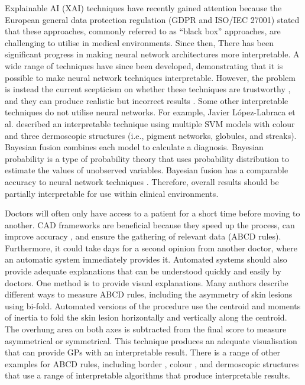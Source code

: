 \documentclass[10.5pt]{report}
\begin{document}
Explainable AI (XAI) techniques have recently gained attention because the European general data protection regulation (GDPR and ISO/IEC 27001) stated that these approaches, commonly referred to as ``black box'' approaches, are challenging to utilise in medical environments. Since then, There has been significant progress in making neural network architectures more interpretable. A wide range of techniques \cite{Fuji2019,  Selvaraju2016, Ribeiro2016} have since been developed, demonstrating that it is possible to make neural network techniques interpretable. However, the problem is instead the current scepticism on whether these techniques are trustworthy \cite{Tjoa2019, Samek2019a}, and they can produce realistic but incorrect results \cite{Ghorbani2019}. Some other interpretable techniques do not utilise neural networks. For example, Javier López-Labraca et al. \cite{Lopez-Labraca2018} described an interpretable technique using multiple SVM models with colour and three dermoscopic structures (i.e., pigment networks, globules, and streaks). Bayesian fusion combines each model to calculate a diagnosis. Bayesian probability is a type of probability theory that uses probability distribution to estimate the values of unobserved variables. Bayesian fusion has a comparable accuracy to neural network techniques \cite{Takruri2017}. Therefore, overall results should be partially interpretable for use within clinical environments.

Doctors will often only have access to a patient for a short time before moving to another. CAD frameworks are beneficial because they speed up the process, can improve accuracy \cite{Dick2019}, and ensure the gathering of relevant data (ABCD rules). Furthermore, it could take days for a second opinion from another doctor, where an automatic system immediately provides it. Automated systems should also provide adequate explanations that can be understood quickly and easily by doctors. One method is to provide visual explanations. Many authors \cite{Zaqout2016, Kasmi2016a, Ali2020a} describe different ways to measure ABCD rules, including the asymmetry of skin lesions using bi-fold. Automated versions of the procedure use the centroid and moments of inertia to fold the skin lesion horizontally and vertically along the centroid. The overhung area on both axes is subtracted from the final score to measure asymmetrical or symmetrical. This technique produces an adequate visualisation that can provide GPs with an interpretable result. There is a range of other examples for ABCD rules, including border \cite{Kasmi2016a, Zaqout2016, Ali2020b}, colour \cite{She2007, Tenenhaus2010, Kasmi2016a}, and dermoscopic structures \cite{Lopez-Labraca2018} that use a range of interpretable algorithms that produce interpretable results.
\end{document}
